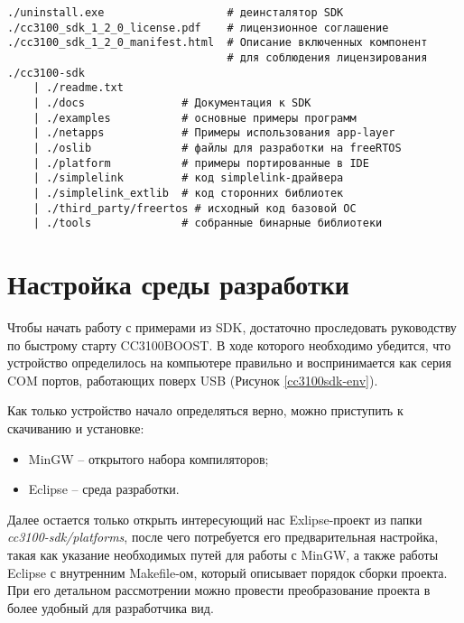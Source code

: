 \begin{verbatim}
./uninstall.exe                   # деинсталятор SDK
./cc3100_sdk_1_2_0_license.pdf    # лицензионное соглашение
./cc3100_sdk_1_2_0_manifest.html  # Описание включенных компонент
                                  # для соблюдения лицензирования
./cc3100-sdk
    | ./readme.txt
    | ./docs               # Документация к SDK
    | ./examples           # основные примеры программ
    | ./netapps            # Примеры использования app-layer
    | ./oslib              # файлы для разработки на freeRTOS
    | ./platform           # примеры портированные в IDE
    | ./simplelink         # код simplelink-драйвера
    | ./simplelink_extlib  # код сторонних библиотек
    | ./third_party/freertos # исходный код базовой ОС
    | ./tools              # собранные бинарные библиотеки
\end{verbatim}

\clearpage

\section{Настройка среды разработки}

Чтобы начать работу с примерами из SDK, достаточно проследовать
руководству по быстрому старту CC3100BOOST\cite{cc3100boostgetstart}.
В ходе которого необходимо убедится, что устройство определилось на
компьютере правильно и воспринимается как серия COM портов,
работающих поверх USB (Рисунок \ref{cc3100sdk-env}).


Как только устройство начало определяться верно,
можно приступить к скачиванию и установке:
\begin{itemize}
    \item MinGW -- открытого набора компиляторов;
    \item Eclipse -- среда разработки.
\end{itemize}

Далее остается только открыть интересующий нас Exlipse-проект
из папки \textit{cc3100-sdk/platforms}, после чего потребуется
его предварительная настройка, такая как указание
необходимых путей для работы с MinGW, а также
работы Eclipse с внутренним Makefile-ом, который
описывает порядок сборки проекта. При его детальном рассмотрении
можно провести преобразование проекта в более удобный
для разработчика вид.

